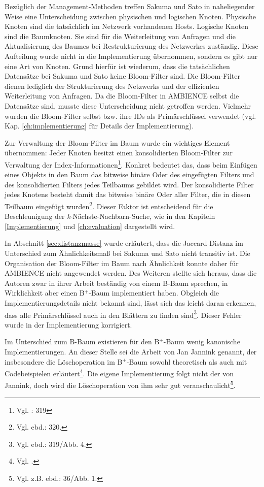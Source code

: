 Bezüglich der Management-Methoden treffen Sakuma und Sato in naheliegender Weise eine Unterscheidung zwischen physischen und logischen Knoten. Physische Knoten sind die tatsächlich im Netzwerk vorhandenen Hosts. Logische Knoten sind die Baumknoten. Sie sind für die Weiterleitung von Anfragen und die Aktualisierung des Baumes bei Restrukturierung des Netzwerkes zuständig. Diese Aufteilung wurde nicht in die Implementierung übernommen, sondern es gibt nur eine Art von Knoten. Grund hierfür ist wiederum, dass die tatsächlichen Datensätze bei Sakuma und Sato keine Bloom-Filter sind. Die Bloom-Filter dienen lediglich der Strukturierung des Netzwerks und der effizienten Weiterleitung von Anfragen. Da die Bloom-Filter in AMBIENCE selbst die Datensätze sind, musste diese Unterscheidung nicht getroffen werden. Vielmehr wurden die Bloom-Filter selbst bzw. ihre IDs als Primärschlüssel verwendet (vgl. Kap. \ref{ch:implementierung} für Details der Implementierung). 

Zur Verwaltung der Bloom-Filter im Baum wurde ein wichtiges Element übernommen: Jeder Knoten besitzt einen konsolidierten Bloom-Filter zur Verwaltung der Index-Informationen\footnote{Vgl. \cite{Sakuma2011}: 319}.  Konkret bedeutet das, dass beim Einfügen eines Objekts in den Baum das bitweise binäre Oder des eingefügten Filters und des konsolidierten Filters jedes Teilbaums gebildet wird. Der konsolidierte Filter jedes Knotens besteht damit das bitweise binäre Oder aller Filter, die in diesen Teilbaum eingefügt wurden\footnote{Vgl. ebd.: 320.}. Dieser Faktor ist entscheidend für die Beschleunigung der \textit{k}-Nächste-Nachbarn-Suche, wie in den Kapiteln \ref{Implementierung} und \ref{ch:evaluation} dargestellt wird. 

In Abschnitt \ref{sec:distanzmasse} wurde erläutert, dass die Jaccard-Distanz im Unterschied zum Ähnlichkeitsmaß bei Sakuma und Sato nicht transitiv ist. Die Organisation der Bloom-Filter im Baum nach Ähnlichkeit konnte daher für AMBIENCE nicht angewendet werden. Des Weiteren stellte sich heraus, dass die Autoren zwar in ihrer Arbeit beständig von einem B-Baum sprechen, in Wirklichkeit aber einen B$^+$-Baum implementiert haben. Obgleich die Implementierungsdetails nicht bekannt sind, lässt sich das leicht daran erkennen, dass alle Primärschlüssel auch in den Blättern zu finden sind\footnote{Vgl. ebd.: 319/Abb. 4.}. Dieser Fehler wurde in der Implementierung korrigiert. 

Im Unterschied zum B-Baum existieren für den B$^+$-Baum wenig kanonische Implementierungen. An dieser Stelle sei die Arbeit von Jan Jannink genannt, der insbesondere die Löschoperation im B$^+$-Baum sowohl theoretisch als auch mit Codebeispielen erläutert\footnote{Vgl. \cite{Jannink1995}.}. Die eigene Implementierung folgt nicht der von Jannink, doch wird die Löschoperation von ihm sehr gut veranschaulicht\footnote{Vgl. z.B. ebd.: 36/Abb. 1.}. 

